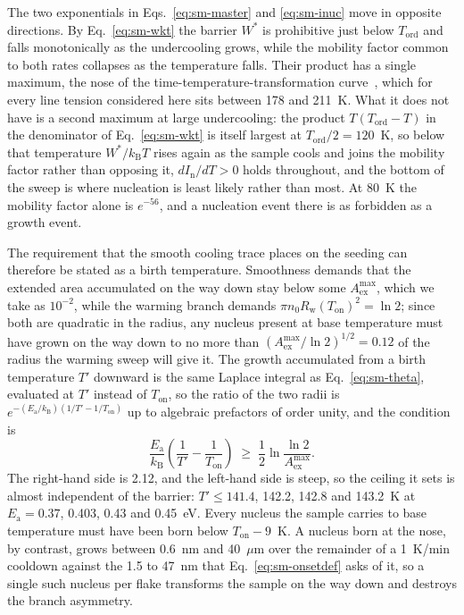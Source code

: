 \documentclass[reprint,twocolumn,prb,amsmath,amssymb,superscriptaddress,floatfix]{revtex4-2}
\newcommand{\kB}{k_{\mathrm{B}}}
\newcommand{\Ea}{E_{\mathrm{a}}}
\newcommand{\Ton}{T_{\mathrm{on}}}
\newcommand{\Tcol}{T_{\mathrm{ord}}}
\begin{document}
The two exponentials in Eqs.~\eqref{eq:sm-master} and \eqref{eq:sm-inuc} move in opposite
directions. By Eq.~\eqref{eq:sm-wkt} the barrier $W^{*}$ is prohibitive just below $\Tcol$ and
falls monotonically as the undercooling grows, while the mobility factor common to both rates
collapses as the temperature falls. Their product has a single maximum, the nose of the
time-temperature-transformation curve~\cite{Uhlmann1972}, which for every line tension considered
here sits between 178 and 211~K. What it does not have is a second maximum at large
undercooling: the product
$T(\Tcol-T)$ in the denominator of Eq.~\eqref{eq:sm-wkt} is itself largest at $\Tcol/2=120$~K,
so below that temperature $W^{*}/\kB T$ rises again as the sample cools and joins the mobility
factor rather than opposing it, $dI_{\mathrm{n}}/dT>0$ holds throughout, and the bottom of the
sweep is where nucleation is least likely rather than most. At 80~K the mobility factor alone is
$e^{-56}$, and a nucleation event there is as forbidden as a growth event.

The requirement that the smooth cooling trace places on the seeding can therefore be stated as
a birth temperature. Smoothness demands that the extended area accumulated on the way down stay
below some $A_{\mathrm{ex}}^{\max}$, which we take as $10^{-2}$, while the warming branch
demands $\pi n_{0}R_{\mathrm{w}}(\Ton)^{2}=\ln2$; since both are quadratic in the radius, any
nucleus present at base temperature must have grown on the way down to no more than
$(A_{\mathrm{ex}}^{\max}/\ln2)^{1/2}=0.12$ of the radius the warming sweep will give it. The
growth accumulated from a birth temperature $T'$ downward is the same Laplace integral as
Eq.~\eqref{eq:sm-theta}, evaluated at $T'$ instead of $\Ton$, so the ratio of the two radii is
$e^{-(\Ea/\kB)(1/T'-1/\Ton)}$ up to algebraic prefactors of order unity, and the condition is
\begin{equation}
  \frac{\Ea}{\kB}\left(\frac{1}{T'}-\frac{1}{\Ton}\right)
  \;\geq\; \frac{1}{2}\ln\frac{\ln2}{A_{\mathrm{ex}}^{\max}} .
  \label{eq:sm-nose}
\end{equation}
The right-hand side is 2.12, and the left-hand side is steep, so the ceiling it sets is almost
independent of the barrier: $T'\leq141.4$, 142.2, 142.8 and 143.2~K at $\Ea=0.37$, 0.403, 0.43
and 0.45~eV. Every nucleus the sample carries to base temperature must have been born below
$\Ton-9$~K. A nucleus born at the nose, by contrast, grows between 0.6~nm and 40~$\mu$m over
the remainder of a 1~K/min cooldown against the 1.5 to 47~nm that Eq.~\eqref{eq:sm-onsetdef}
asks of it, so a single such nucleus per flake transforms the sample on the way down and
destroys the branch asymmetry.
\end{document}
